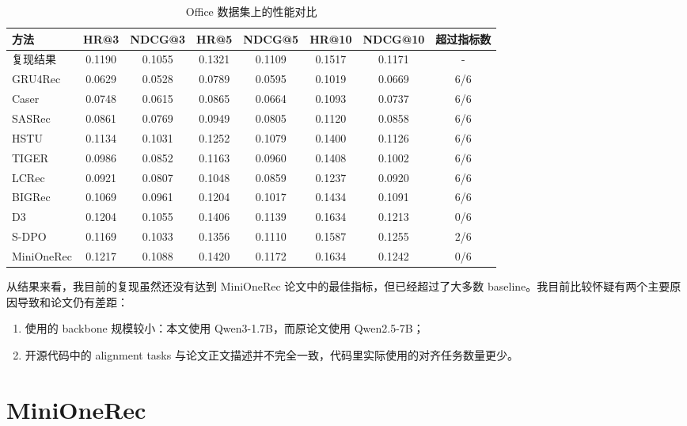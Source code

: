 \documentclass[11pt]{article}
\begin{document}
\begin{table}[htbp]
  \centering
  \caption{Office 数据集上的性能对比\protect\footnotemark[1]}
  \small
  \begin{tabular}{l *{6}{S[table-format=1.4]} c}
    \toprule
    方法 & {HR@3} & {NDCG@3} & {HR@5} & {NDCG@5} & {HR@10} & {NDCG@10} & {超过指标数} \\
    \midrule
    复现结果 & 0.1190 & 0.1055 & 0.1321 & 0.1109 & 0.1517 & 0.1171 & - \\
    GRU4Rec & 0.0629 & 0.0528 & 0.0789 & 0.0595 & 0.1019 & 0.0669 & 6/6 \\
    Caser & 0.0748 & 0.0615 & 0.0865 & 0.0664 & 0.1093 & 0.0737 & 6/6 \\
    SASRec & 0.0861 & 0.0769 & 0.0949 & 0.0805 & 0.1120 & 0.0858 & 6/6 \\
    HSTU & 0.1134 & 0.1031 & 0.1252 & 0.1079 & 0.1400 & 0.1126 & 6/6 \\
    TIGER & 0.0986 & 0.0852 & 0.1163 & 0.0960 & 0.1408 & 0.1002 & 6/6 \\
    LCRec & 0.0921 & 0.0807 & 0.1048 & 0.0859 & 0.1237 & 0.0920 & 6/6 \\
    BIGRec & 0.1069 & 0.0961 & 0.1204 & 0.1017 & 0.1434 & 0.1091 & 6/6 \\
    D3 & 0.1204 & 0.1055 & 0.1406 & 0.1139 & 0.1634 & 0.1213 & 0/6 \\
    S-DPO & 0.1169 & 0.1033 & 0.1356 & 0.1110 & 0.1587 & 0.1255 & 2/6 \\
    MiniOneRec & 0.1217 & 0.1088 & 0.1420 & 0.1172 & 0.1634 & 0.1242 & 0/6 \\
    \bottomrule
  \end{tabular}
\end{table}


从结果来看，我目前的复现虽然还没有达到 MiniOneRec 论文中的最佳指标，但已经超过了大多数 baseline。我目前比较怀疑有两个主要原因导致和论文仍有差距：  
\begin{enumerate}
  \item 使用的 backbone 规模较小：本文使用 Qwen3-1.7B，而原论文使用 Qwen2.5-7B；
  \item 开源代码中的 alignment tasks 与论文正文描述并不完全一致，代码里实际使用的对齐任务数量更少。
\end{enumerate}

\section{MiniOneRec}
\end{document}
